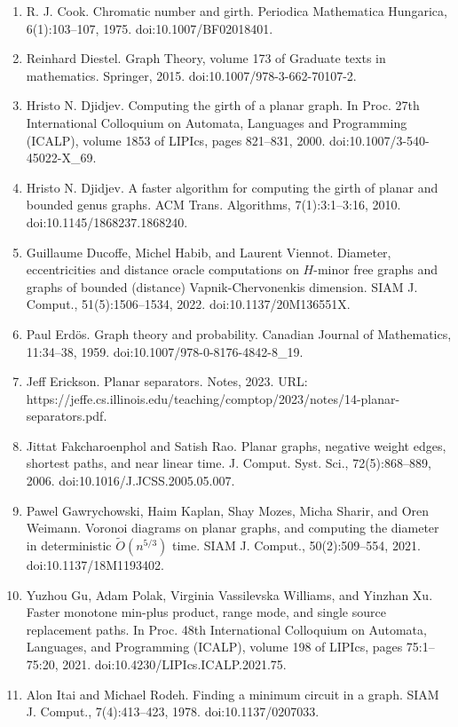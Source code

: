 \begin{enumerate}
\item[]  [22]  R. J. Cook.  Chromatic number and girth.  Periodica Mathematica Hungarica, 6(1):103–107, 1975.  doi:10.1007/BF02018401.  
\item[]  [23]  Reinhard Diestel.  Graph Theory, volume 173 of Graduate texts in mathematics.  Springer, 2015.  doi:10.1007/978-3-662-70107-2.  
\item[]  [24]  Hristo N. Djidjev.  Computing the girth of a planar graph.  In Proc. 27th International Colloquium on Automata, Languages and Programming (ICALP), volume 1853 of LIPIcs, pages 821–831, 2000.  doi:10.1007/3-540-45022-X\_69.  
\item[]  [25]  Hristo N. Djidjev.  A faster algorithm for computing the girth of planar and bounded genus graphs.  ACM Trans. Algorithms, 7(1):3:1–3:16, 2010.  doi:10.1145/1868237.1868240.  
\item[]  [26]  Guillaume Ducoffe, Michel Habib, and Laurent Viennot.  Diameter, eccentricities and distance oracle computations on $H$-minor free graphs and graphs of bounded (distance) Vapnik-Chervonenkis dimension.  SIAM J. Comput., 51(5):1506–1534, 2022.  doi:10.1137/20M136551X.  
\item[]  [27]  Paul Erdös.  Graph theory and probability.  Canadian Journal of Mathematics, 11:34–38, 1959.  doi:10.1007/978-0-8176-4842-8\_19.  
\item[]  [28]  Jeff Erickson.  Planar separators.  Notes, 2023.  URL: https://jeffe.cs.illinois.edu/teaching/comptop/2023/notes/14-planar-separators.pdf.  
\item[]  [29]  Jittat Fakcharoenphol and Satish Rao.  Planar graphs, negative weight edges, shortest paths, and near linear time.  J. Comput. Syst. Sci., 72(5):868–889, 2006.  doi:10.1016/J.JCSS.2005.05.007.  
\item[]  [30]  Pawel Gawrychowski, Haim Kaplan, Shay Mozes, Micha Sharir, and Oren Weimann.  Voronoi diagrams on planar graphs, and computing the diameter in deterministic $\tilde{O}(n^{5/3})$ time.  SIAM J. Comput., 50(2):509–554, 2021.  doi:10.1137/18M1193402.  
\item[]  [31]  Yuzhou Gu, Adam Polak, Virginia Vassilevska Williams, and Yinzhan Xu.  Faster monotone min-plus product, range mode, and single source replacement paths.  In Proc. 48th International Colloquium on Automata, Languages, and Programming (ICALP), volume 198 of LIPIcs, pages 75:1–75:20, 2021.  doi:10.4230/LIPIcs.ICALP.2021.75.  
\item[]  [32]  Alon Itai and Michael Rodeh.  Finding a minimum circuit in a graph.  SIAM J. Comput., 7(4):413–423, 1978.  doi:10.1137/0207033.  

\end{enumerate}
